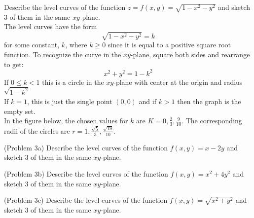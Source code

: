\documentclass[handout]{ximera}
\begin{document}
\begin{example}[Example 3]
Describe the level curves of the function $z = f(x, y) = \sqrt{1-x^2 - y^2}$ and sketch 3 of them in the same $xy$-plane.\\
The level curves have the form 
\[
\sqrt{1 - x^2 - y^2} = k
\]
for some constant, $k$, where $k \geq 0$ since it is equal to a positive square root function. To recognize the curve in the $xy$-plane, square both sides and rearrange to get:
\[
x^2 + y^2 = 1- k^2 
\]
If $0 \leq k < 1$ this is a circle in the $xy$-plane with center at the origin and radius $\sqrt{1-k^2}$\\
If $k = 1$, this is just the single point $(0, 0)$ and if $k>1$ then the graph is the empty set.\\
In the figure below, the chosen values for $k$ are $K = 0, \frac23, \frac{9}{10}$.  The corresponding radii of the circles are $r = 1, \frac{\sqrt{5}}{3}, \frac{\sqrt{19}}{10}$.

\begin{image}
\end{image}

\end{example}

\begin{problem}(Problem 3a)
Describe the level curves of the function $f(x,y) = x - 2y$ and sketch 3 of them in the same $xy$-plane.\\
\end{problem}

\begin{problem}(Problem 3b)
Describe the level curves of the function $f(x, y) = x^2 + 4y^2$ and sketch 3 of them in the same $xy$-plane.\\
\end{problem}

\begin{problem}(Problem 3c)
Describe the level curves of the function $f(x, y) = \sqrt{x^2 + y^2}$ and sketch 3 of them in the same $xy$-plane.\\
\end{problem}
\end{document}
